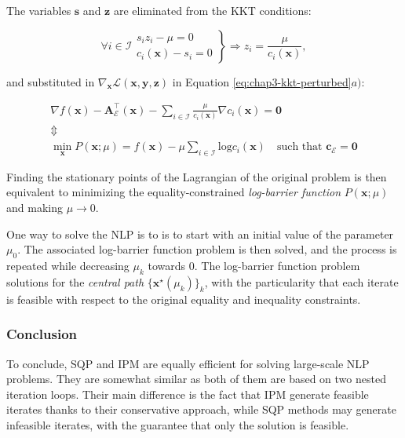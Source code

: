 The variables $\mathbf{s}$ and $\mathbf{z}$ are eliminated from the
KKT conditions:

\begin{equation}
\forall i \in \mathcal{I}
\left.\begin{array}{r}
s_iz_i - \mu = 0\\
c_i(\mathbf{x})-s_i = 0
\end{array}\right\}
\Rightarrow
z_i=\frac{\mu}{c_i(\mathbf{x})},
\end{equation}

and substituted in
$\nabla_{\mathbf{x}}\mathcal{L}(\mathbf{x},\mathbf{y},\mathbf{z})$
in Equation \ref{eq:chap3-kkt-perturbed}$a)$:

\begin{equation}
\begin{array}{c}
\nabla f(\mathbf{x}) - \mathbf{A}_{\mathcal{E}}^{\top}(\mathbf{x}) -
\sum_{i\in\mathcal{I}}\frac{\mu}{c_i(\mathbf{x})}\nabla
c_i(\mathbf{x})=\mathbf{0} \\
\Updownarrow \\
\min_{\mathbf{x}}P(\mathbf{x};\mu)=f(\mathbf{x}) -
\mu\sum_{i\in\mathcal{I}}\text{log}c_i(\mathbf{x}) \quad\text{
  such that }\mathbf{c_{\mathcal{E}}=\mathbf{0}}
\end{array}
\end{equation}

Finding the stationary points of the Lagrangian of the original
problem is then equivalent to minimizing the equality-constrained
\emph{log-barrier function} $P(\mathbf{x};\mu)$ and making $\mu
\rightarrow 0$.

One way to solve the NLP is to is to start with an initial value of
the parameter $\mu_0$. The associated log-barrier function problem is
then solved, and the process is repeated while decreasing $\mu_k$
towards 0. The log-barrier function problem solutions for the
\emph{central path} $\{\mathbf{x}^\star(\mu_k)\}_k$, with the
particularity that each iterate is feasible with respect to the
original equality and inequality constraints.

\subsubsection{Conclusion}

To conclude, SQP and IPM are equally efficient for solving large-scale
NLP problems. They are somewhat similar as both of them are based on
two nested iteration loops. Their main difference is the fact that IPM
generate feasible iterates thanks to their conservative approach,
while SQP methods may generate infeasible iterates, with the guarantee
that only the solution is feasible.

